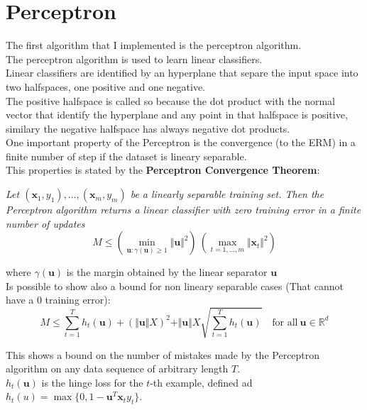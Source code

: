 \newpage
\section{Perceptron}

The first algorithm that I implemented is the perceptron algorithm.\\
The perceptron algorithm is used to learn linear classifiers.\\
Linear classifiers are identified by an hyperplane that separe the input space into two halfspaces, one positive and one negative.\\
The positive halfspace is called so because the dot product with the normal vector that identify the hyperplane and any point in that halfspace is positive, similary the negative halfspace has always negative dot products.\\
One important property of the Perceptron is the convergence (to the ERM) in a finite number of step if the dataset is lineary separable.\\
This properties is stated by the \textbf{Perceptron Convergence Theorem}:

\textit{Let $(\boldsymbol{x}_1 , y_1 ), \dots, (\boldsymbol{x}_m , y_m)$ be a linearly separable training set. Then the Perceptron algorithm returns a linear classifier with zero training error in a finite number of updates}
$$
M \leq \left(\underset{\boldsymbol{u} : \gamma(\boldsymbol{u}) \geq 1}{\min} \Vert \boldsymbol{u} \Vert^2 \right) \ \left( \underset{t = 1, \dots, m}{\max} \Vert \boldsymbol{x}_t \Vert^2 \right)
$$

where $\gamma (\boldsymbol{u})$ is the margin obtained by the linear separator $\boldsymbol{u}$\\ 
 
Is possible to show also a bound for non lineary separable cases (That cannot have a 0 training error):\\

$$
M \leq \sum_{t=1}^{T} h_{t}(\boldsymbol{u}) + (\Vert \boldsymbol{u} \Vert X)^2 + \Vert \boldsymbol{u} \Vert X \sqrt{\sum_{t=1}^{T}h_t (\boldsymbol{u})} \quad \text{for all}\ \boldsymbol{u} \in \mathbb{R}^d    
$$

This shows a bound on the number of mistakes made by the Perceptron algorithm on any data sequence of arbitrary length $T$.\\
$h_{t}(\boldsymbol{u})$ is the hinge loss for the $t$-th example, defined ad $h_t(u) = \max\{0, 1 - \boldsymbol{u}^T \boldsymbol{x}_t y_t\}$.\\


